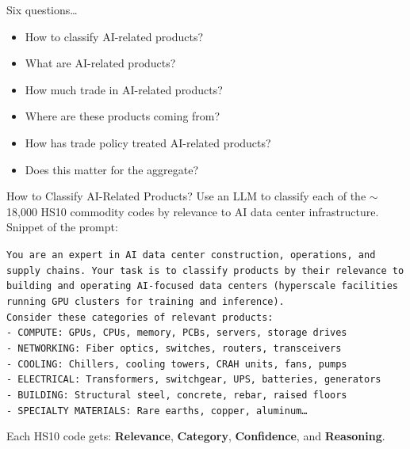 \documentclass[10pt,pdftex,aspectratio=169]{beamer}
\theoremstyle{definition}
\begin{document}
\begin{frame}[t]{Six questions\ldots}
\begin{itemize}
\item How to classify AI-related products?
\medskip
\item What are AI-related products?
\medskip
\item How much trade in AI-related products?
\medskip
\item Where are these products coming from?
\medskip
\item How has trade policy treated AI-related products?
\medskip
\item Does this matter for the aggregate?
\end{itemize}
\end{frame}


\begin{frame}[t]{How to Classify AI-Related Products?}
Use an LLM to classify each of the $\sim$18,000 HS10 commodity codes by relevance to AI data center infrastructure. Snippet of the prompt:\\
{\tiny
\begin{tcolorbox}[colback=gray!5!white, colframe=gray!50!white, boxrule=0.5pt, top=3mm, bottom=3mm, left=3mm, right=3mm]
{\small \texttt{You are an expert in AI data center construction, operations, and supply chains. Your task is to classify products by their relevance to building and operating AI-focused data centers (hyperscale facilities running GPU clusters for training and inference).}\\

\texttt{Consider these categories of relevant products:}\\
\texttt{- COMPUTE: GPUs, CPUs, memory, PCBs, servers, storage drives}\\
\texttt{- NETWORKING: Fiber optics, switches, routers, transceivers}\\
\texttt{- COOLING: Chillers, cooling towers, CRAH units, fans, pumps}\\
\texttt{- ELECTRICAL: Transformers, switchgear, UPS, batteries, generators}\\
\texttt{- BUILDING: Structural steel, concrete, rebar, raised floors}\\
\texttt{- SPECIALTY MATERIALS: Rare earths, copper, aluminum\ldots}}
\end{tcolorbox}}
\medskip
{\small Each HS10 code gets: \textbf{Relevance}, \textbf{Category}, \textbf{Confidence}, and \textbf{Reasoning}.}
\end{frame}
\end{document}
